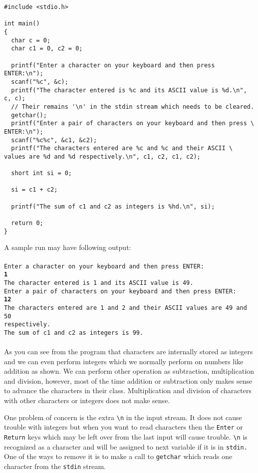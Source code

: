 \begin{verbatim}
#include <stdio.h>

int main()
{
  char c = 0;
  char c1 = 0, c2 = 0;

  printf("Enter a character on your keyboard and then press ENTER:\n");
  scanf("%c", &c);
  printf("The character entered is %c and its ASCII value is %d.\n", c, c);
  // Their remains '\n' in the stdin stream which needs to be cleared.
  getchar();
  printf("Enter a pair of characters on your keyboard and then press \
ENTER:\n");
  scanf("%c%c", &c1, &c2);
  printf("The characters entered are %c and %c and their ASCII \
values are %d and %d respectively.\n", c1, c2, c1, c2);

  short int si = 0;

  si = c1 + c2;

  printf("The sum of c1 and c2 as integers is %hd.\n", si);

  return 0;
}
\end{verbatim}

A sample run may have following output:
\\\\\texttt{Enter a character on your keyboard and then press ENTER:\\
\textbf{1}\\
The character entered is 1 and its ASCII value is 49.\\
Enter a pair of characters on your keyboard and then press ENTER:\\
\textbf{12}\\
The characters entered are 1 and 2 and their ASCII values are 49 and 50\\
respectively.\\
The sum of c1 and c2 as integers is 99.\\\\}
As you can see from the program that characters are internally stored as
integers and we can even perform integers which we normally perform on
numbers like addition as shown. We can perform other operation as subtraction,
multiplication and division, however, most of the time addition or subtraction
only makes sense to advance the characters in their class. Multiplication and
division of characters with other characters or integers does not make sense.

One problem of concern is the extra \texttt{\textbackslash n} in the input
stream. It does not cause trouble with integers but when you want to read
characters then the \texttt{Enter} or \texttt{Return} keys which may be left
over from the last input will cause trouble. \texttt{\textbackslash n} is
recognized as a character and will be assigned to next variable if it is in
\texttt{stdin.} One of the ways to remove it is to make a call to
\texttt{getchar} which reads one character from the \texttt{stdin} stream.

